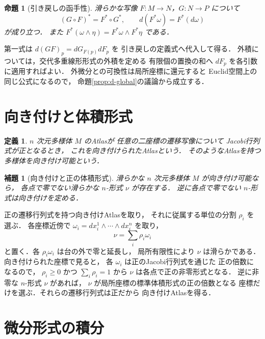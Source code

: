 \documentclass[a5paper,10pt,onecolumn]{jsarticle}
\makeatletter
\theoremstyle{mathnotetheorem}
\newtheorem{definition}[theorem]{定義}
\newtheorem{lemma}[theorem]{補題}
\newtheorem{proposition}[theorem]{命題}
\renewcommand{\proofname}{証明}
\renewenvironment{proof}[1][\proofname]{%
  \par\pushQED{\qed}\normalfont\topsep4\p@\@plus2\p@\relax
  \trivlist\item[\hskip\labelsep\bfseries #1]\ignorespaces
}{\popQED\endtrivlist\@endpefalse}
\makeatother
\begin{document}
\begin{proposition}[引き戻しの函手性]\label{prop:pullback}
滑らかな写像 $F:M\to N$，$G:N\to P$ について
\[
 (G\circ F)^*=F^*\circ G^*,\qquad
 d(F^*\omega)=F^*(d\omega)
\]
が成り立つ．
また $F^*(\omega\wedge\eta)
=F^*\omega\wedge F^*\eta$ である．
\end{proposition}
\begin{proof}
第一式は
$d(GF)_p=dG_{F(p)}dF_p$ を
引き戻しの定義式へ代入して得る．
外積については，交代多重線形形式の外積を定める
有限個の置換の和へ $dF_p$ を各引数に適用すればよい．
外微分との可換性は局所座標に還元すると
Euclid空間上の同じ公式になるので，
命題\ref{prop:d-global}の議論から成立する．
\end{proof}

\section{向き付けと体積形式}

\begin{definition}
$n$ 次元多様体 $M$ のAtlasが
任意の二座標の遷移写像について
Jacobi行列式が正となるとき，
これを\emph{向き付けられたAtlas}という．
そのようなAtlasを持つ多様体を向き付け可能という．
\end{definition}

\begin{lemma}[向き付けと正の体積形式]
\label{lem:volume}
滑らかな $n$ 次元多様体 $M$ が向き付け可能なら，
各点で零でない滑らかな $n$-形式 $\nu$ が存在する．
逆に各点で零でない $n$-形式は向き付けを定める．
\end{lemma}
\begin{proof}
正の遷移行列式を持つ向き付けAtlasを取り，
それに従属する単位の分割 $\rho_i$ を選ぶ．
各座標近傍で
$\omega_i=dx_i^1\wedge\cdots\wedge dx_i^n$
を取り，
\[
 \nu=\sum_i\rho_i\omega_i
\]
と置く．各 $\rho_i\omega_i$ は台の外で零と延長し，
局所有限性により $\nu$ は滑らかである．
向き付けられた座標で見ると，
各 $\omega_i$ は正のJacobi行列式を通じた
正の倍数になるので，
$\rho_i\ge0$ かつ $\sum_i\rho_i=1$ から
$\nu$ は各点で正の非零形式となる．
逆に非零な $n$-形式 $\nu$ があれば，
$\nu$ が局所座標の標準体積形式の正の倍数となる
座標だけを選ぶ．それらの遷移行列式は正だから
向き付けAtlasを得る．
\end{proof}

\section{微分形式の積分}
\end{document}
